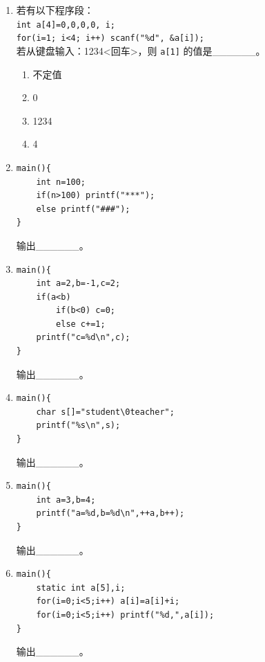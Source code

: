 \documentclass[a4paper,12pt]{article}
\begin{document}
\begin{enumerate}
	\item 若有以下程序段：\\
	      \texttt{int a[4]={0,0,0,0}, i;}\\
	      \texttt{for(i=1; i<4; i++) scanf("\%d", \&a[i]);}\\
	      若从键盘输入：1234<回车>，则 \texttt{a[1]} 的值是\_\_\_\_\_\_。
	      \begin{enumerate}
		      \item[A)] 不定值
		      \item[B)] 0
		      \item[C)] 1234
		      \item[D)] 4
	      \end{enumerate}
	      \vspace{0.3cm}

	\item
	      \begin{verbatim}
main(){
    int n=100;
    if(n>100) printf("***");
    else printf("###");
}
    \end{verbatim}
	      输出\_\_\_\_\_\_。
	      \vspace{0.3cm}

	\item
	      \begin{verbatim}
main(){
    int a=2,b=-1,c=2;
    if(a<b)
        if(b<0) c=0;
        else c+=1;
    printf("c=%d\n",c);
}
    \end{verbatim}
	      输出\_\_\_\_\_\_。
	      \vspace{0.3cm}

	\item
	      \begin{verbatim}
main(){
    char s[]="student\0teacher";
    printf("%s\n",s);
}
    \end{verbatim}
	      输出\_\_\_\_\_\_。
	      \vspace{0.3cm}

	\item
	      \begin{verbatim}
main(){
    int a=3,b=4;
    printf("a=%d,b=%d\n",++a,b++);
}
    \end{verbatim}
	      输出\_\_\_\_\_\_。
	      \vspace{0.3cm}

	\item
	      \begin{verbatim}
main(){
    static int a[5],i;
    for(i=0;i<5;i++) a[i]=a[i]+i;
    for(i=0;i<5;i++) printf("%d,",a[i]);
}
    \end{verbatim}
	      输出\_\_\_\_\_\_。
	      \vspace{0.3cm}


\end{enumerate}
\end{document}
